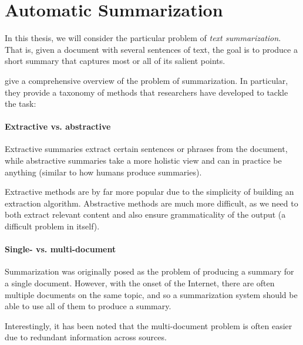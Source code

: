 \documentclass[12pt]{report}
\begin{document}
\section{Automatic Summarization}
\label{sec:taxonomy}

In this thesis, we will consider the particular problem of \emph{text summarization}. That is, given a document with several sentences of text, the goal is to produce a short summary that captures most or all of its salient points.




\citet{Nenkova2011} give a comprehensive overview of the problem of summarization. In particular, they provide a taxonomy of methods that researchers have developed to tackle the task:

\paragraph{Extractive vs. abstractive} Extractive summaries extract certain sentences or phrases from the document, while abstractive summaries take a more holistic view and can in practice be anything (similar to how humans produce summaries). 

Extractive methods are by far more popular due to the simplicity of building an extraction algorithm. Abstractive methods are much more difficult, as we need to both extract relevant content and also ensure grammaticality of the output (a difficult problem in itself).

\paragraph{Single- vs. multi-document} Summarization was originally posed as the problem of producing a summary for a single document. However, with the onset of the Internet, there are often multiple documents on the same topic, and so a summarization system should be able to use all of them to produce a summary.

Interestingly, it has been noted that the multi-document problem is often easier due to redundant information across sources.

\end{document}
